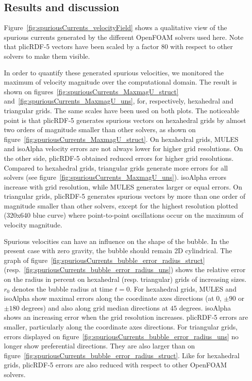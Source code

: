 \documentclass[review]{elsarticle}
\begin{document}
\subsection{Results and discussion}\label{sec_spuriousresults}
Figure~\ref{fig:spuriousCurrents_velocityField} shows a qualitative view of the spurious currents generated by the different OpenFOAM solvers used here. Note that plicRDF-5 vectors have been scaled by a factor 80 with respect to other solvers to make them visible.

In order to quantify these generated spurious velocities, we monitored the maximum of velocity magnitude over the computational domain. The result is shown on figures~\ref{fig:spuriousCurrents_MaxmagU_struct} and~\ref{fig:spuriousCurrents_MaxmagU_uns}, for, respectively, hexahedral and triangular grids. The same scales have been used on both plots. The noticeable point is that plicRDF-5 generates spurious vectors on hexahedral grids by almost two orders of magnitude smaller than other solvers, as shown on figure~\ref{fig:spuriousCurrents_MaxmagU_struct}. On hexahedral grids, MULES and isoAlpha velocity errors are not always lower for higher grid resolutions. On the other side, plicRDF-5 obtained reduced errors for higher grid resolutions. Compared to hexahedral grids, triangular grids generate more errors for all solvers (see figure~\ref{fig:spuriousCurrents_MaxmagU_uns}). isoAlpha errors increase with grid resolution, while MULES generates larger or equal errors. On triangular grids, plicRDF-5 generates spurious vectors by more than one order of magnitude smaller than other solvers, except for the highest resolution plotted (320x640 blue curve) where point-to-point oscillations occur on the maximum of velocity magnitude. 

Spurious velocities can have an influence on the shape of the bubble. In the present case with zero gravity, the bubble should remain 2D cylindrical. The graph of figure~\ref{fig:spuriousCurrents_bubble_error_radius_struct} (resp.~\ref{fig:spuriousCurrents_bubble_error_radius_uns}) shows the relative error on the radius in percent on hexahedral (resp. triangular) grids of increasing sizes. $r_0$ denotes the bubble radius at time $t=0$. For hexahedral grids, MULES and isoAlpha show maximal errors along the coordinate axes directions (at $0$, $\pm 90$ or $\pm 180$ degrees) and also along grid median directions at $45$ degrees. isoAlpha shows an increasing error when the grid resolution increases. plicRDF-5 errors are smaller, particularly along the coordinate axes directions. For triangular grids, errors displayed on figure~\ref{fig:spuriousCurrents_bubble_error_radius_uns} no longer show preferential directions. They are also larger than on figure~\ref{fig:spuriousCurrents_bubble_error_radius_struct}. Like for hexahedral grids, plicRDF-5 errors are also reduced with respect to other OpenFOAM solvers. 
\end{document}
